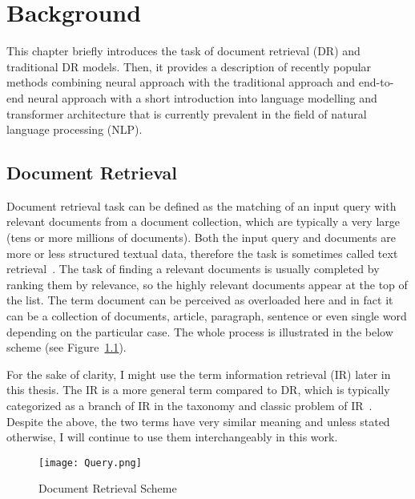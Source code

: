 \chapter{Background}
\label{chapter:background}
    This chapter briefly introduces the task of document retrieval (DR) and traditional DR models. Then, it provides a description of recently popular methods combining neural approach with the traditional approach and end-to-end neural approach with a short introduction into language modelling and transformer architecture that is currently prevalent in the field of natural language processing (NLP).

\section{Document Retrieval}
\label{section:dr-task}
    Document retrieval task can be defined as the matching of an input query with relevant documents from a document collection, which are typically a very large (tens or more millions of documents). Both the input query and documents are more or less structured textual data, therefore the task is sometimes called text retrieval~\parencite{manning2008introduction}. The task of finding a relevant documents is usually completed by ranking them by relevance, so the highly relevant documents appear at the top of the list. The term document can be perceived as overloaded here and in fact it can be a collection of documents, article, paragraph, sentence or even single word depending on the particular case. The whole process is illustrated in the below scheme (see Figure~\ref{fig:dr-scheme}).

    For the sake of clarity, I might use the term information retrieval (IR) later in this thesis. The IR is a more general term compared to DR, which is typically categorized as a branch of IR in the taxonomy and classic problem of IR~\parencite{mitra-intro-to-ir}. Despite the above, the two terms have very similar meaning and unless stated otherwise, I will continue to use them interchangeably in this work. 
    \begin{figure}[H]
        \texttt{[image: Query.png]}
        \centering
        \caption{Document Retrieval Scheme}
        \label{fig:dr-scheme}
    \end{figure}
    
